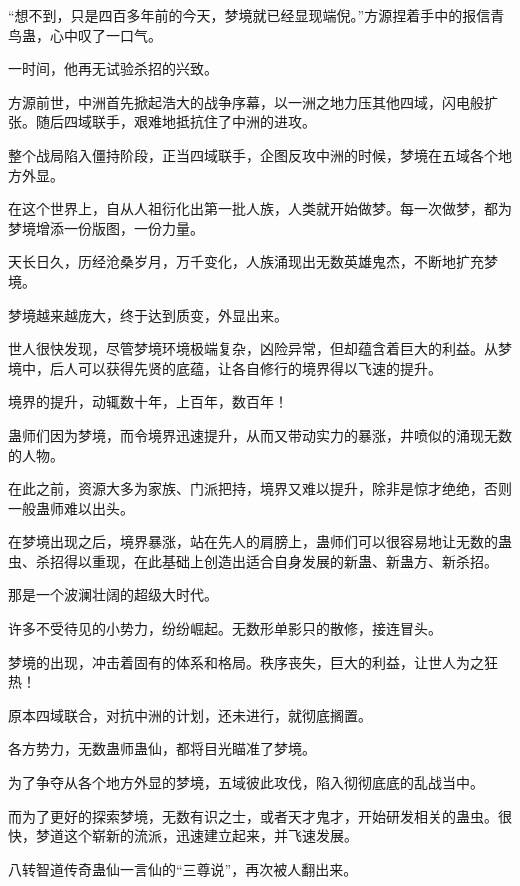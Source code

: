 
\begin{this_body}

“想不到，只是四百多年前的今天，梦境就已经显现端倪。”方源捏着手中的报信青鸟蛊，心中叹了一口气。

一时间，他再无试验杀招的兴致。

方源前世，中洲首先掀起浩大的战争序幕，以一洲之地力压其他四域，闪电般扩张。随后四域联手，艰难地抵抗住了中洲的进攻。

整个战局陷入僵持阶段，正当四域联手，企图反攻中洲的时候，梦境在五域各个地方外显。

在这个世界上，自从人祖衍化出第一批人族，人类就开始做梦。每一次做梦，都为梦境增添一份版图，一份力量。

天长日久，历经沧桑岁月，万千变化，人族涌现出无数英雄鬼杰，不断地扩充梦境。

梦境越来越庞大，终于达到质变，外显出来。

世人很快发现，尽管梦境环境极端复杂，凶险异常，但却蕴含着巨大的利益。从梦境中，后人可以获得先贤的底蕴，让各自修行的境界得以飞速的提升。

境界的提升，动辄数十年，上百年，数百年！

蛊师们因为梦境，而令境界迅速提升，从而又带动实力的暴涨，井喷似的涌现无数的人物。

在此之前，资源大多为家族、门派把持，境界又难以提升，除非是惊才绝绝，否则一般蛊师难以出头。

在梦境出现之后，境界暴涨，站在先人的肩膀上，蛊师们可以很容易地让无数的蛊虫、杀招得以重现，在此基础上创造出适合自身发展的新蛊、新蛊方、新杀招。

那是一个波澜壮阔的超级大时代。

许多不受待见的小势力，纷纷崛起。无数形单影只的散修，接连冒头。

梦境的出现，冲击着固有的体系和格局。秩序丧失，巨大的利益，让世人为之狂热！

原本四域联合，对抗中洲的计划，还未进行，就彻底搁置。

各方势力，无数蛊师蛊仙，都将目光瞄准了梦境。

为了争夺从各个地方外显的梦境，五域彼此攻伐，陷入彻彻底底的乱战当中。

而为了更好的探索梦境，无数有识之士，或者天才鬼才，开始研发相关的蛊虫。很快，梦道这个崭新的流派，迅速建立起来，并飞速发展。

八转智道传奇蛊仙一言仙的“三尊说”，再次被人翻出来。


\end{this_body}
